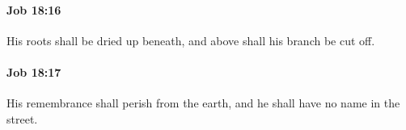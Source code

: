 		\paragraph{Job 18:16} %
			\label{JOB-18-16}

			His roots shall be dried up beneath, and above shall his branch be cut off.


		\paragraph{Job 18:17} %
			\label{JOB-18-17}

			His remembrance shall perish from the earth, and he shall have no name in the street.


